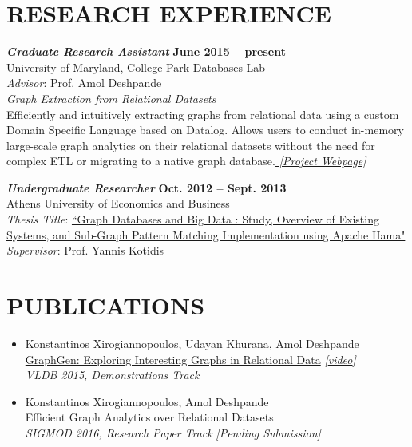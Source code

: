 \documentclass[margin, 10pt]{res} %
\begin{document}
\begin{resume}

\section{RESEARCH EXPERIENCE}

{\sl \textbf{Graduate Research Assistant}} \hfill \textbf{June 2015 -- present} \\
University of Maryland, College Park \href{http://www.cs.umd.edu/~amol/DBGroup/pubs.html}{Databases Lab}\\
\textit{Advisor}: Prof. Amol Deshpande\\
{\sl Graph Extraction from Relational Datasets}\\
  Efficiently and intuitively extracting graphs from relational data using a custom Domain Specific Language based on Datalog. Allows users to conduct in-memory large-scale graph analytics on their relational datasets without the need for complex ETL or migrating to a native graph database.\href{http://konstantinosx.github.io/graphgen-project/}{\textit{ [Project Webpage]}}

{\sl \textbf{Undergraduate Researcher}} \hfill \textbf{Oct. 2012 -- Sept. 2013}\\
Athens University of Economics and Business\\
\textit{Thesis Title}:
\href{https://drive.google.com/open?id=0B20MIwp_I7FlVFlNVWtQb3VXTmM}{``Graph Databases and Big Data : Study, Overview of Existing Systems, and Sub-Graph Pattern Matching Implementation using Apache Hama"}\\
\textit{Supervisor}: Prof. Yannis Kotidis


\section{PUBLICATIONS }

\begin{itemize}
   \item Konstantinos Xirogiannopoulos, Udayan Khurana, Amol Deshpande\\
  \href{http://www.vldb.org/pvldb/vol8/p2032-xirogiannopoulos.pdf}{GraphGen: Exploring Interesting Graphs in Relational Data} \textit{[\href{https://www.youtube.com/watch?v=GDVBLv-oedQ}{video}]}\\
  \textit{VLDB 2015, Demonstrations Track}
  \item Konstantinos Xirogiannopoulos, Amol Deshpande\\
  Efficient Graph Analytics over Relational Datasets\\
  \textit{ SIGMOD 2016, Research Paper Track} \textit{ [Pending Submission]}
\end{itemize}


\end{resume}
\end{document}
